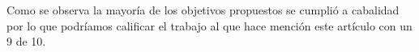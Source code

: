 \documentclass[journal]{IEEEtran}
\begin{document}
Como se observa  la mayoría de los objetivos propuestos se cumplió a cabalidad por lo que podríamos calificar el trabajo al que hace mención este artículo con un 9 de 10.









\ifCLASSOPTIONcaptionsoff
  \newpage
\fi









\end{document}
